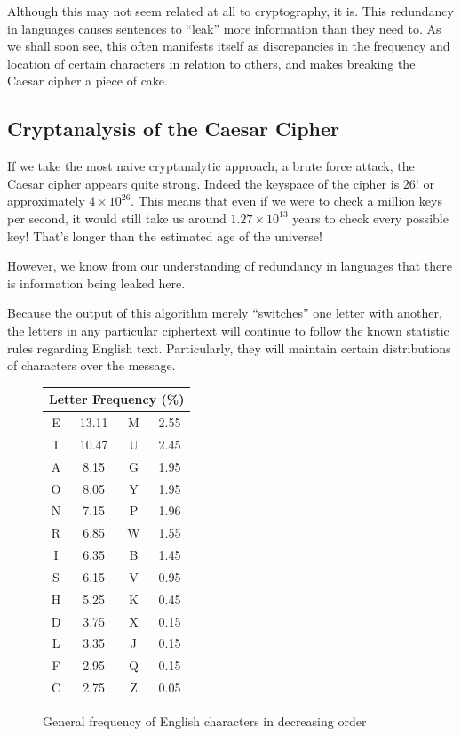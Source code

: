 \documentclass[12pt, a4paper, final]{report}
\begin{document}
Although this may not seem related at all to cryptography, it is. This
redundancy in languages causes sentences to ``leak'' more information than
they need to. As we shall soon see, this often manifests itself as
discrepancies in the frequency and location of certain characters in
relation to others, and makes breaking the Caesar cipher a piece of
cake.

\subsection{Cryptanalysis of the Caesar Cipher}

If we take the most naive cryptanalytic approach, a brute force attack,
the Caesar cipher appears quite strong. Indeed the keyspace of the cipher
is $26!$ or approximately $4 \times 10^{26}$. This means that even if we
were to check a million keys per second, it would still take us around
$1.27 \times 10^{13}$ years to check every possible key! That's longer than
the estimated age of the universe!

However, we know from our understanding of redundancy in languages that there
is information being leaked here.

Because the output of this algorithm merely ``switches'' one letter with another,
the letters in any particular ciphertext will continue to follow the known
statistic rules regarding English text. Particularly, they will maintain certain
distributions of characters over the message.

\begin{figure}[h]
\begin{center}
\begin{tabular}{cccc}
\toprule
\multicolumn{4}{c}{Letter Frequency (\%)}\\
\midrule
E & 13.11 & M & 2.55\\
T & 10.47 & U & 2.45\\
A & 8.15  & G & 1.95\\
O & 8.05  & Y & 1.95\\
N & 7.15  & P & 1.96\\
R & 6.85  & W & 1.55\\
I & 6.35  & B & 1.45\\
S & 6.15  & V & 0.95\\
H & 5.25  & K & 0.45\\
D & 3.75  & X & 0.15\\
L & 3.35  & J & 0.15\\
F & 2.95  & Q & 0.15\\
C & 2.75  & Z & 0.05\\
\bottomrule
\end{tabular}
\end{center}
\caption{General frequency of English characters in decreasing order}
\end{figure}
\end{document}
